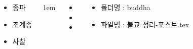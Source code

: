 \documentclass[20pt, a0paper, landscape]{tikzposter}
\begin{document}
\begin{columns}
{\begin{LARGE}
\begin{itemize}
					\item 종파
					\item 조계종

					\item 사찰


					\end{itemize}
				\end{LARGE}
			} %


			{
					\setlength{\leftmargini}{3em}
					\setlength{\labelsep} {1em}
				\begin{LARGE}
					\begin{itemize}
					\item 
					\item 
					\item 
					\end{itemize}
				\end{LARGE}
			} %

			{
				\begin{LARGE}
					\begin{itemize}
					\item 폴더명 : buddha
					\item 파일명 : 불교 정리-포스트.tex
					\end{itemize}
				\end{LARGE}
			}





	\end{columns}
\end{document}
